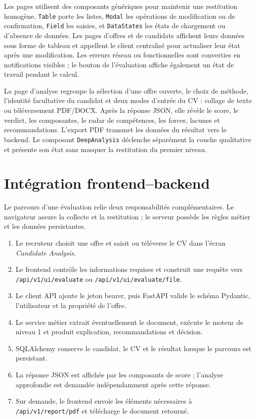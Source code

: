 Les pages utilisent des composants génériques pour maintenir une restitution homogène. \texttt{Table} porte les listes, \texttt{Modal} les opérations de modification ou de confirmation, \texttt{Field} les saisies, et \texttt{DataStates} les états de chargement ou d'absence de données. Les pages d'offres et de candidats affichent leurs données sous forme de tableau et appellent le client centralisé pour actualiser leur état après une modification. Les erreurs réseau ou fonctionnelles sont converties en notifications visibles ; le bouton de l'évaluation affiche également un état de travail pendant le calcul.

La page d'analyse regroupe la sélection d'une offre ouverte, le choix de méthode, l'identité facultative du candidat et deux modes d'entrée du CV : collage de texte ou téléversement PDF/DOCX. Après la réponse JSON, elle révèle le score, le verdict, les composantes, le radar de compétences, les forces, lacunes et recommandations. L'export PDF transmet les données du résultat vers le backend. Le composant \texttt{DeepAnalysis} déclenche séparément la couche qualitative et présente son état sans masquer la restitution du premier niveau.

\section{Intégration frontend--backend}

Le parcours d'une évaluation relie deux responsabilités complémentaires. Le navigateur assure la collecte et la restitution ; le serveur possède les règles métier et les données persistantes.

\begin{enumerate}
  \item Le recruteur choisit une offre et saisit ou téléverse le CV dans l'écran \emph{Candidate Analysis}.
  \item Le frontend contrôle les informations requises et construit une requête vers \texttt{/api/v1/ui/evaluate} ou \texttt{/api/v1/ui/evaluate/file}.
  \item Le client API ajoute le jeton bearer, puis FastAPI valide le schéma Pydantic, l'utilisateur et la propriété de l'offre.
  \item Le service métier extrait éventuellement le document, exécute le moteur de niveau 1 et produit explication, recommandations et décision.
  \item SQLAlchemy conserve le candidat, le CV et le résultat lorsque le parcours est persistant.
  \item La réponse JSON est affichée par les composants de score ; l'analyse approfondie est demandée indépendamment après cette réponse.
  \item Sur demande, le frontend envoie les éléments nécessaires à \texttt{/api/v1/report/pdf} et télécharge le document retourné.
\end{enumerate}


